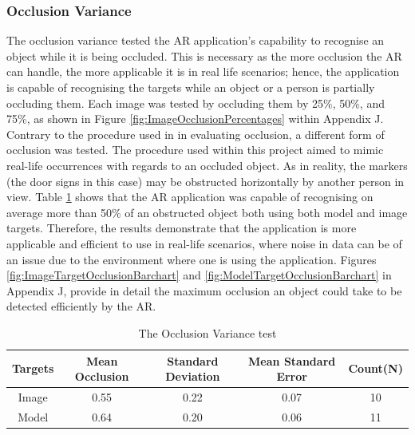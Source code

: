 \documentclass{aifyp}
\begin{document}
\subsubsection{Occlusion Variance}
The occlusion variance tested the AR application's capability to recognise an object while it is being occluded. This is necessary as the more occlusion the AR can handle, the more applicable it is in real life scenarios; hence, the application is capable of recognising the targets while an object or a person is partially occluding them. Each image was tested by occluding them by 25\%, 50\%, and 75\%, as shown in Figure \ref{fig:ImageOcclusionPercentages} within Appendix J. Contrary to the procedure used in \cite{MobileARQualityEval} in evaluating occlusion, a different form of occlusion was tested. The procedure used within this project aimed to mimic real-life occurrences with regards to an occluded object. As in reality, the markers (the door signs in this case) may be obstructed horizontally by another person in view. Table \ref{tab:OcclusionVarianceTable} shows that the AR application was capable of recognising on average more than 50\% of an obstructed object both using both model and image targets. Therefore, the results demonstrate that the application is more applicable and efficient to use in real-life scenarios, where noise in data can be of an issue due to the environment where one is using the application. Figures \ref{fig:ImageTargetOcclusionBarchart} and \ref{fig:ModelTargetOcclusionBarchart} in Appendix J, provide in detail the maximum occlusion an object could take to be detected efficiently by the AR.

\begin{table}[h]
\begin{center}
\begin{tabular}{|c|c|c|c|c|}
\hline
\textbf{Targets} & \textbf{Mean Occlusion} & \textbf{Standard Deviation} & \textbf{Mean Standard Error} & \textbf{Count(N)} \\ \hline
Image & 0.55 & 0.22 & 0.07 & 10\\ \hline
Model & 0.64 & 0.20 & 0.06 & 11\\ \hline
\end{tabular}
\caption{The Occlusion Variance test }
\label{tab:OcclusionVarianceTable}
\end{center}
\end{table}
\end{document}
